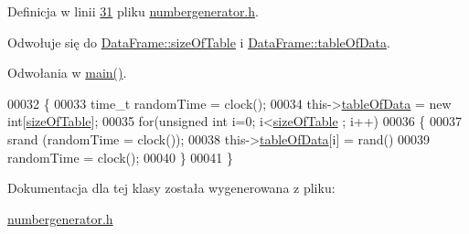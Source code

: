 Definicja w linii \hyperlink{numbergenerator_8h_source_l00031}{31} pliku \hyperlink{numbergenerator_8h_source}{numbergenerator.\-h}.



Odwołuje się do \hyperlink{dataframe_8h_source_l00034}{Data\-Frame\-::size\-Of\-Table} i \hyperlink{dataframe_8h_source_l00021}{Data\-Frame\-::table\-Of\-Data}.



Odwołania w \hyperlink{main_8cpp_source_l00017}{main()}.


\begin{DoxyCode}
00032 \{
00033         time\_t randomTime = clock();
00034         this->\hyperlink{class_data_frame_a8edc4ce524483e2e5069067267ccdcbf}{tableOfData} = \textcolor{keyword}{new} \textcolor{keywordtype}{int}[\hyperlink{class_data_frame_aa5d1905c6910cad07ab5189bd34b13ab}{sizeOfTable}];
00035         \textcolor{keywordflow}{for}(\textcolor{keywordtype}{unsigned} \textcolor{keywordtype}{int} i=0; i<\hyperlink{class_data_frame_aa5d1905c6910cad07ab5189bd34b13ab}{sizeOfTable} ; i++)
00036         \{
00037                 srand (randomTime = clock());
00038                 this->\hyperlink{class_data_frame_a8edc4ce524483e2e5069067267ccdcbf}{tableOfData}[i] = rand()%
00039                 randomTime = clock();
00040         \}
00041 \}
\end{DoxyCode}


Dokumentacja dla tej klasy została wygenerowana z pliku\-:\begin{DoxyCompactItemize}
\item 
\hyperlink{numbergenerator_8h}{numbergenerator.\-h}\end{DoxyCompactItemize}
